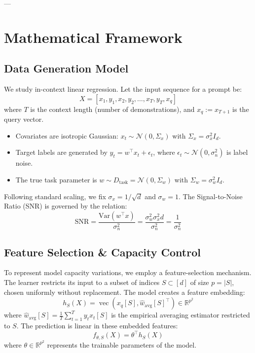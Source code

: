 \documentclass[11pt,a4paper]{article}
\begin{document}
---

\section{Mathematical Framework}

\subsection{Data Generation Model}
We study in-context linear regression. Let the input sequence for a prompt be:
\begin{equation}
    X = [x_1, y_1, x_2, y_2, \dots, x_T, y_T, x_q]
\end{equation}
where $T$ is the context length (number of demonstrations), and $x_q := x_{T+1}$ is the query vector. 
\begin{itemize}
    \item Covariates are isotropic Gaussian: $x_t \sim \mathcal{N}(0, \Sigma_x)$ with $\Sigma_x = \sigma_x^2 I_d$.
    \item Target labels are generated by $y_t = w^\top x_t + \epsilon_t$, where $\epsilon_t \sim \mathcal{N}(0, \sigma_n^2)$ is label noise.
    \item The true task parameter is $w \sim D_{\text{task}} = \mathcal{N}(0, \Sigma_w)$ with $\Sigma_w = \sigma_w^2 I_d$.
\end{itemize}
Following standard scaling, we fix $\sigma_x = 1/\sqrt{d}$ and $\sigma_w = 1$. The Signal-to-Noise Ratio (SNR) is governed by the relation:
\begin{equation}
    \text{SNR} = \frac{\text{Var}(w^\top x)}{\sigma_n^2} = \frac{\sigma_w^2 \sigma_x^2 d}{\sigma_n^2} = \frac{1}{\sigma_n^2}
\end{equation}

\subsection{Feature Selection \& Capacity Control}
To represent model capacity variations, we employ a feature-selection mechanism. The learner restricts its input to a subset of indices $S \subset [d]$ of size $p = |S|$, chosen uniformly without replacement.
The model creates a feature embedding:
\begin{equation}
    h_S(X) = \operatorname{vec}\left( x_q[S], \hat{w}_{\text{avg}}[S]^\top \right) \in \mathbb{R}^{p^2}
\end{equation}
where $\hat{w}_{\text{avg}}[S] = \frac{1}{T} \sum_{t=1}^T y_t x_t[S]$ is the empirical averaging estimator restricted to $S$. The prediction is linear in these embedded features:
\begin{equation}
    f_{\theta, S}(X) = \theta^\top h_S(X)
\end{equation}
where $\theta \in \mathbb{R}^{p^2}$ represents the trainable parameters of the model.
\end{document}
